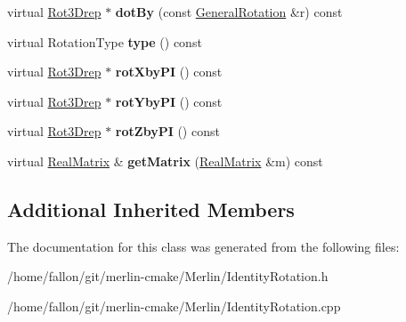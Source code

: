 \begin{DoxyCompactItemize}
\item 
\mbox{\label{classIdentityRotation_acf6c046dc7ea95d34cbae6872239bae3}} 
virtual \hyperlink{classRot3Drep}{Rot3\+Drep} $\ast$ {\bfseries dot\+By} (const \hyperlink{classGeneralRotation}{General\+Rotation} \&r) const
\item 
\mbox{\label{classIdentityRotation_aa8258d47fac52dc471541538b8ca7365}} 
virtual Rotation\+Type {\bfseries type} () const
\item 
\mbox{\label{classIdentityRotation_a771942c0c1c9094d9e80e190b042fdd3}} 
virtual \hyperlink{classRot3Drep}{Rot3\+Drep} $\ast$ {\bfseries rot\+Xby\+PI} () const
\item 
\mbox{\label{classIdentityRotation_aff89a5217963d997707bb0584d21909b}} 
virtual \hyperlink{classRot3Drep}{Rot3\+Drep} $\ast$ {\bfseries rot\+Yby\+PI} () const
\item 
\mbox{\label{classIdentityRotation_a4471302431f5cdbf70b661691d6d77fb}} 
virtual \hyperlink{classRot3Drep}{Rot3\+Drep} $\ast$ {\bfseries rot\+Zby\+PI} () const
\item 
\mbox{\label{classIdentityRotation_aad8dc19f0d23592f784464d8a701b530}} 
virtual \hyperlink{classTLAS_1_1Matrix}{Real\+Matrix} \& {\bfseries get\+Matrix} (\hyperlink{classTLAS_1_1Matrix}{Real\+Matrix} \&m) const
\end{DoxyCompactItemize}
\subsection*{Additional Inherited Members}


The documentation for this class was generated from the following files\+:\begin{DoxyCompactItemize}
\item 
/home/fallon/git/merlin-\/cmake/\+Merlin/Identity\+Rotation.\+h\item 
/home/fallon/git/merlin-\/cmake/\+Merlin/Identity\+Rotation.\+cpp\end{DoxyCompactItemize}
